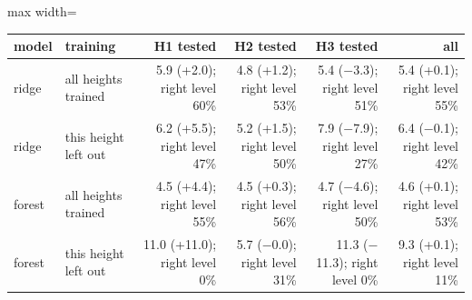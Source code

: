 \begin{adjustbox}{max width=\textwidth}
{\scriptsize
\begin{tabular}{llrrrr}
\toprule
\textbf{model} & \textbf{training} & \textbf{H1 tested} & \textbf{H2 tested} & \textbf{H3 tested} & \textbf{all} \\
\midrule
ridge & all heights trained & 5.9 (+2.0); right level 60\% & 4.8 (+1.2); right level 53\% & 5.4 ($-$3.3); right level 51\% & 5.4 (+0.1); right level 55\% \\
ridge & this height left out & 6.2 (+5.5); right level 47\% & 5.2 (+1.5); right level 50\% & 7.9 ($-$7.9); right level 27\% & 6.4 ($-$0.1); right level 42\% \\
forest & all heights trained & 4.5 (+4.4); right level 55\% & 4.5 (+0.3); right level 56\% & 4.7 ($-$4.6); right level 50\% & 4.6 (+0.1); right level 53\% \\
forest & this height left out & 11.0 (+11.0); right level 0\% & 5.7 ($-$0.0); right level 31\% & 11.3 ($-$11.3); right level 0\% & 9.3 (+0.1); right level 11\% \\
\bottomrule
\end{tabular}
}
\end{adjustbox}

